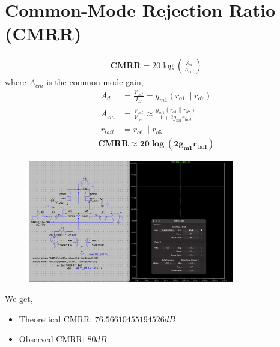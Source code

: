\documentclass[12pt,a4paper]{article}
\newcommand{\brak}[1]{\ensuremath{\left(#1\right)}}
\providecommand{\brak}[1]{\ensuremath{\left(#1\right)}}
\begin{document}
\section{Common-Mode Rejection Ratio (CMRR)}
\begin{align*}
\textbf{CMRR} = 20 \log{\brak{\frac{A_{d}}{A_{cm}}} }
\end{align*}
where $A_{cm}$ is the common-mode gain,
\begin{align*}
    A_d &= \frac{V_{out}}{I_D} = g_{m1}(r_{o1}\parallel r_{o7}) \\
    A_{cm} &= \frac{V_{out}}{V_{cm}} \approx \frac{g_{m1}(r_{o1}\parallel r_{o7})}{1+2g_{m1}r_{tail}} \\
    r_{tail} &= r_{o6}\parallel r_{o5}
\end{align*}
\begin{align*}
    \mathbf{CMRR \approx 20 \log \brak{2g_{m1}r_{tail}}}
\end{align*}
\vspace{6pt}
\begin{figure}[H]
    \centering
    \includegraphics[width=0.8\textwidth]{figs/CMRR.png}
\end{figure}
We get,
\begin{itemize}
    \item Theoretical CMRR: $76.56610455194526 dB$
    \item Observed CMRR: $80 dB$
\end{itemize}

\vspace{10pt}
\end{document}
